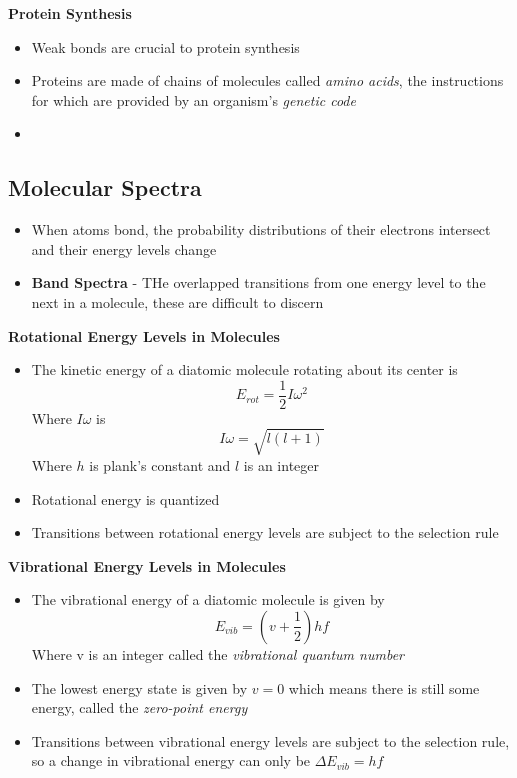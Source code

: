 \textbf{Protein Synthesis}
\begin{itemize}
    \item Weak bonds are crucial to protein synthesis
    \item Proteins are made of chains of molecules called \emph{amino acids}, the instructions for which are provided by an organism's \emph{genetic code}
    \item 
\end{itemize}

\subsection{Molecular Spectra}
\begin{itemize}
    \item When atoms bond, the probability distributions of their electrons intersect and their energy levels change
    \item \textbf{Band Spectra} - THe overlapped transitions from one energy level to the next in a molecule, these are difficult to discern
\end{itemize}

\textbf{Rotational Energy Levels in Molecules}
\begin{itemize}
    \item The kinetic energy of a diatomic molecule rotating about its center is \[E_{rot}=\frac{1}{2}I\omega^2\] Where \(I\omega\) is \[I\omega=\sqrt{l(l+1)}\] Where \(h\) is plank's constant and \(l\) is an integer
    \item Rotational energy is quantized
    \item Transitions between rotational energy levels are subject to the selection rule
\end{itemize}

\textbf{Vibrational Energy Levels in Molecules}
\begin{itemize}
    \item The vibrational energy of a diatomic molecule is given by \[E_{vib}=(v+\frac{1}{2})hf\] Where v is an integer called the \emph{vibrational quantum number} 
    \item The lowest energy state is given by \(v=0\) which means there is still some energy, called the \emph{zero-point energy}
    \item Transitions between vibrational energy levels are subject to the selection rule, so a change in vibrational energy can only be \(\Delta E_{vib}=hf\)
\end{itemize}

